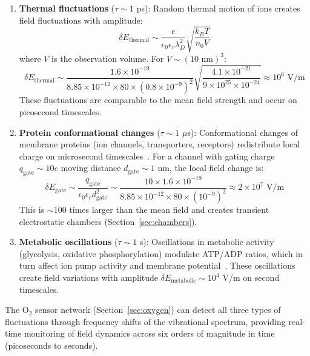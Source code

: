 \documentclass[twocolumn,10pt,aps,prd,superscriptaddress,floatfix,nofootinbib]{revtex4-2}
\theoremstyle{remark}
\begin{document}
\begin{enumerate}
\item \textbf{Thermal fluctuations} ($\tau \sim 1$ ps): Random thermal motion of ions creates field fluctuations with amplitude:
\begin{equation}
\delta E_{\mathrm{thermal}} \sim \frac{e}{\epsilon_0\epsilon_r\lambda_D^2} \sqrt{\frac{k_B T}{n_0 V}}
\end{equation}
where $V$ is the observation volume. For $V \sim (10 \text{ nm})^3$:
\begin{equation}
\delta E_{\mathrm{thermal}} \sim \frac{1.6 \times 10^{-19}}{8.85 \times 10^{-12} \times 80 \times (0.8 \times 10^{-9})^2} \sqrt{\frac{4.1 \times 10^{-21}}{9 \times 10^{25} \times 10^{-24}}} \approx 10^{6} \text{ V/m}
\end{equation}
These fluctuations are comparable to the mean field strength and occur on picosecond timescales.

\item \textbf{Protein conformational changes} ($\tau \sim 1$ $\mu$s): Conformational changes of membrane proteins (ion channels, transporters, receptors) redistribute local charge on microsecond timescales~\cite{Hille2001}. For a channel with gating charge $q_{\mathrm{gate}} \sim 10e$ moving distance $d_{\mathrm{gate}} \sim 1$ nm, the local field change is:
\begin{equation}
\delta E_{\mathrm{gate}} \sim \frac{q_{\mathrm{gate}}}{\epsilon_0\epsilon_r d_{\mathrm{gate}}^2} \sim \frac{10 \times 1.6 \times 10^{-19}}{8.85 \times 10^{-12} \times 80 \times (10^{-9})^2} \approx 2 \times 10^{7} \text{ V/m}
\end{equation}
This is $\sim 100$ times larger than the mean field and creates transient electrostatic chambers (Section~\ref{sec:chambers}).

\item \textbf{Metabolic oscillations} ($\tau \sim 1$ s): Oscillations in metabolic activity (glycolysis, oxidative phosphorylation) modulate ATP/ADP ratios, which in turn affect ion pump activity and membrane potential~\cite{Chance1973}. These oscillations create field variations with amplitude $\delta E_{\mathrm{metabolic}} \sim 10^{4}$ V/m on second timescales.
\end{enumerate}

The O$_2$ sensor network (Section~\ref{sec:oxygen}) can detect all three types of fluctuations through frequency shifts of the vibrational spectrum, providing real-time monitoring of field dynamics across six orders of magnitude in time (picoseconds to seconds).
\end{document}
